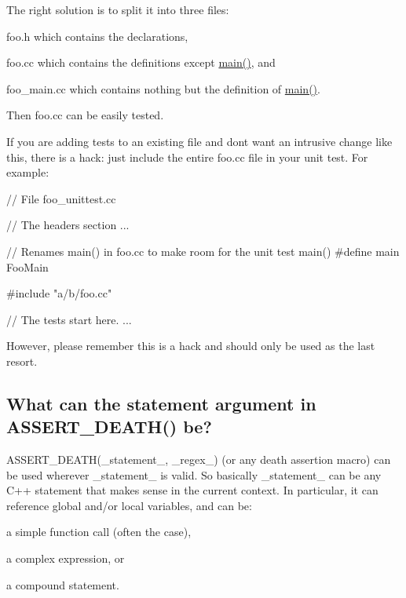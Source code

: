 The right solution is to split it into three files\+:
\begin{DoxyEnumerate}
\item {\ttfamily foo.\+h} which contains the declarations,
\end{DoxyEnumerate}
\begin{DoxyEnumerate}
\item {\ttfamily foo.\+cc} which contains the definitions except {\ttfamily \hyperlink{app_2main_8cpp_ae66f6b31b5ad750f1fe042a706a4e3d4}{main()}}, and
\end{DoxyEnumerate}
\begin{DoxyEnumerate}
\item {\ttfamily foo\+\_\+main.\+cc} which contains nothing but the definition of {\ttfamily \hyperlink{app_2main_8cpp_ae66f6b31b5ad750f1fe042a706a4e3d4}{main()}}.
\end{DoxyEnumerate}

Then {\ttfamily foo.\+cc} can be easily tested.

If you are adding tests to an existing file and don\textquotesingle{}t want an intrusive change like this, there is a hack\+: just include the entire {\ttfamily foo.\+cc} file in your unit test. For example\+: 
\begin{DoxyCode}
// File foo\_unittest.cc

// The headers section
...

// Renames main() in foo.cc to make room for the unit test main()
#define main FooMain

#include "a/b/foo.cc"

// The tests start here.
...
\end{DoxyCode}


However, please remember this is a hack and should only be used as the last resort.

\subsection*{What can the statement argument in A\+S\+S\+E\+R\+T\+\_\+\+D\+E\+A\+T\+H() be?}

{\ttfamily A\+S\+S\+E\+R\+T\+\_\+\+D\+E\+A\+T\+H(\+\_\+statement\+\_\+, \+\_\+regex\+\_\+)} (or any death assertion macro) can be used wherever {\ttfamily \+\_\+statement\+\_\+} is valid. So basically {\ttfamily \+\_\+statement\+\_\+} can be any C++ statement that makes sense in the current context. In particular, it can reference global and/or local variables, and can be\+:
\begin{DoxyItemize}
\item a simple function call (often the case),
\item a complex expression, or
\item a compound statement.
\end{DoxyItemize}

